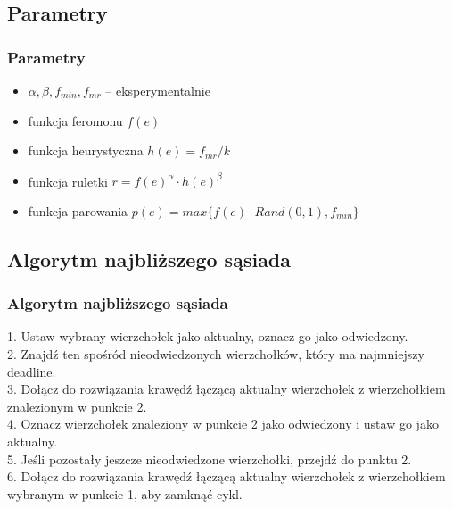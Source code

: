 \documentclass{beamer}
\begin{document}
\subsection{Parametry}

\begin{frame}
\frametitle{Parametry}
\begin{itemize}

\item $\alpha, \beta, f_{min}, f_{mr}$ -- eksperymentalnie
\item funkcja feromonu $f(e)$
\item funkcja heurystyczna $h(e) = f_{mr}/k$
\item funkcja ruletki $r = f(e)^\alpha \cdot h(e)^\beta$ 
\item funkcja parowania $p(e) = max\{f(e) \cdot Rand(0,1), f_{min}\}$

\end{itemize}

\iffalse
1. Dla każdej mrówki wylosuj miasto początkowe \\
2. Niech każda mrówka przejdzie cykl Hamiltona w grafie: startując z miasta początkowego, przejdź do dotychczas nieodwiedzonego miasta posługując się funkcją rulteki, jednocześnie pamiętając dotychczas przebytą trasę. Gdy wszystkie miasta zostały odwiedzone powróć do punktu startowego.
3. Po zakończeniu trasy przez wszystkie mrówki dodaj na krawędzie, przez które przeszły wartość równą odwrotności długości przebytej drogi. \\
4. Jeśli w tej iteracji któraś z mrówek znalazła lepszą ścieżkę, to zapamiętaj to rozwiązanie.\\
5. Feromony na krawędziach przemnóż przez współczynnik parowania.\\
6. Wykasuj pamięć dla każdej z mrówek i zacznij kolejną iterację.\\
\fi

\end{frame}

\subsection{Algorytm najbliższego sąsiada}
\begin{frame}
\frametitle{Algorytm najbliższego sąsiada}


1.    Ustaw wybrany wierzchołek jako aktualny, oznacz go jako odwiedzony.\\
2.    Znajdź ten spośród nieodwiedzonych wierzchołków, który ma najmniejszy deadline.\\
3.    Dołącz do rozwiązania krawędź łączącą aktualny wierzchołek z wierzchołkiem znalezionym w punkcie 2.\\
4.    Oznacz wierzchołek znaleziony w punkcie 2 jako odwiedzony i ustaw go jako aktualny.\\
5.    Jeśli pozostały jeszcze nieodwiedzone wierzchołki, przejdź do punktu 2.\\
6.    Dołącz do rozwiązania krawędź łączącą aktualny wierzchołek z wierzchołkiem wybranym w punkcie 1, aby zamknąć cykl.\\


\end{frame}
\end{document}
